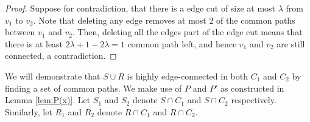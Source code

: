 \documentclass{article}
\newtheorem{lemma}{Lemma}[section]
\begin{document}
\begin{proof}
    Suppose for contradiction, that there is a edge cut of size at most $\lambda$ from $v_1$ to $v_2$. Note that deleting any edge removes at most 2 of the common paths between $v_1$ and $v_2$. Then, deleting all the edges part of the edge cut means that there is at least $2\lambda+1-2\lambda = 1$ common path left, and hence $v_1$ and $v_2$ are still connected, a contradiction. 
\end{proof}




We will demonstrate that $S \cup R$ is highly edge-connected in both $C_1$ and $C_2$ by finding a set of common paths. We make use of $P$ and $P'$ as constructed in Lemma \ref{lem:P(x)}. Let $S_1$ and $S_2$ denote $S \cap C_1$ and $S \cap C_2$ respectively. Similarly, let $R_1$ and $R_2$ denote $R \cap C_1$ and $R \cap C_2$. 
\end{document}
